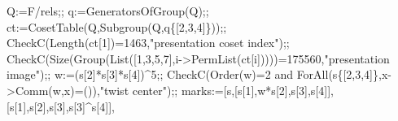 \documentclass[
  10pt,
  letterpaper,
]{article}
\newenvironment{Shaded}{}{}
\newcommand{\BuiltInTok}[1]{\textcolor[rgb]{0.00,0.50,0.00}{#1}}
\newcommand{\ConstantTok}[1]{\textcolor[rgb]{0.53,0.00,0.00}{#1}}
\newcommand{\FloatTok}[1]{\textcolor[rgb]{0.25,0.63,0.44}{#1}}
\newcommand{\NormalTok}[1]{#1}
\newcommand{\OperatorTok}[1]{\textcolor[rgb]{0.40,0.40,0.40}{#1}}
\newcommand{\StringTok}[1]{\textcolor[rgb]{0.25,0.44,0.63}{#1}}
\newcommand{\VariableTok}[1]{\textcolor[rgb]{0.10,0.09,0.49}{#1}}
\begin{document}
\begin{Shaded}
\begin{Highlighting}[]
\VariableTok{Q}\OperatorTok{:=}\VariableTok{F}\OperatorTok{/}\VariableTok{rels}\OperatorTok{;;} \VariableTok{q}\OperatorTok{:=}\BuiltInTok{GeneratorsOfGroup}\NormalTok{(}\VariableTok{Q}\NormalTok{)}\OperatorTok{;;}
\VariableTok{ct}\OperatorTok{:=}\BuiltInTok{CosetTable}\NormalTok{(}\VariableTok{Q}\OperatorTok{,}\BuiltInTok{Subgroup}\NormalTok{(}\VariableTok{Q}\OperatorTok{,}\VariableTok{q}\NormalTok{\{[}\FloatTok{2}\OperatorTok{,}\FloatTok{3}\OperatorTok{,}\FloatTok{4}\NormalTok{]\}))}\OperatorTok{;;}
\VariableTok{CheckC}\NormalTok{(}\BuiltInTok{Length}\NormalTok{(}\VariableTok{ct}\NormalTok{[}\FloatTok{1}\NormalTok{])}\OperatorTok{=}\FloatTok{1463}\OperatorTok{,}\StringTok{"presentation coset index"}\NormalTok{)}\OperatorTok{;;}
\VariableTok{CheckC}\NormalTok{(}\BuiltInTok{Size}\NormalTok{(}\BuiltInTok{Group}\NormalTok{(}\BuiltInTok{List}\NormalTok{([}\FloatTok{1}\OperatorTok{,}\FloatTok{3}\OperatorTok{,}\FloatTok{5}\OperatorTok{,}\FloatTok{7}\NormalTok{]}\OperatorTok{,}\VariableTok{i}\OperatorTok{{-}\textgreater{}}\BuiltInTok{PermList}\NormalTok{(}\VariableTok{ct}\NormalTok{[}\VariableTok{i}\NormalTok{]))))}\OperatorTok{=}\FloatTok{175560}\OperatorTok{,}\StringTok{"presentation image"}\NormalTok{)}\OperatorTok{;;}
\VariableTok{w}\OperatorTok{:=}\NormalTok{(}\VariableTok{s}\NormalTok{[}\FloatTok{2}\NormalTok{]}\OperatorTok{*}\VariableTok{s}\NormalTok{[}\FloatTok{3}\NormalTok{]}\OperatorTok{*}\VariableTok{s}\NormalTok{[}\FloatTok{4}\NormalTok{])}\OperatorTok{\^{}}\FloatTok{5}\OperatorTok{;;}
\VariableTok{CheckC}\NormalTok{(}\BuiltInTok{Order}\NormalTok{(}\VariableTok{w}\NormalTok{)}\OperatorTok{=}\FloatTok{2} \ConstantTok{and} \BuiltInTok{ForAll}\NormalTok{(}\VariableTok{s}\NormalTok{\{[}\FloatTok{2}\OperatorTok{,}\FloatTok{3}\OperatorTok{,}\FloatTok{4}\NormalTok{]\}}\OperatorTok{,}\VariableTok{x}\OperatorTok{{-}\textgreater{}}\BuiltInTok{Comm}\NormalTok{(}\VariableTok{w}\OperatorTok{,}\VariableTok{x}\NormalTok{)}\OperatorTok{=}\NormalTok{())}\OperatorTok{,}\StringTok{"twist center"}\NormalTok{)}\OperatorTok{;;}
\VariableTok{marks}\OperatorTok{:=}\NormalTok{[}\VariableTok{s}\OperatorTok{,}\NormalTok{[}\VariableTok{s}\NormalTok{[}\FloatTok{1}\NormalTok{]}\OperatorTok{,}\VariableTok{w}\OperatorTok{*}\VariableTok{s}\NormalTok{[}\FloatTok{2}\NormalTok{]}\OperatorTok{,}\VariableTok{s}\NormalTok{[}\FloatTok{3}\NormalTok{]}\OperatorTok{,}\VariableTok{s}\NormalTok{[}\FloatTok{4}\NormalTok{]]}\OperatorTok{,}
\NormalTok{ [}\VariableTok{s}\NormalTok{[}\FloatTok{1}\NormalTok{]}\OperatorTok{,}\VariableTok{s}\NormalTok{[}\FloatTok{2}\NormalTok{]}\OperatorTok{,}\VariableTok{s}\NormalTok{[}\FloatTok{3}\NormalTok{]}\OperatorTok{,}\VariableTok{s}\NormalTok{[}\FloatTok{3}\NormalTok{]}\OperatorTok{\^{}}\VariableTok{s}\NormalTok{[}\FloatTok{4}\NormalTok{]]}\OperatorTok{,}

\end{Highlighting}
\end{Shaded}
\end{document}
